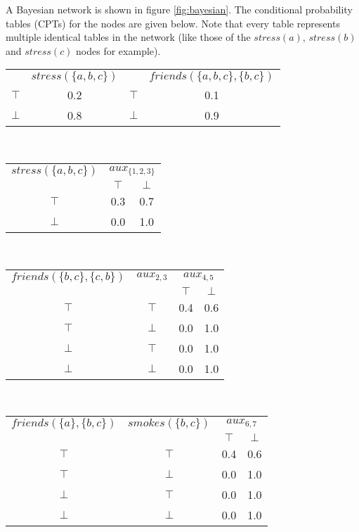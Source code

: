 A Bayesian network is shown in figure \ref{fig:bayesian}. The conditional probability tables (CPTs) for the nodes are given below. Note that every table represents multiple identical tables in the network (like those of the $stress(a)$, $stress(b)$ and $stress(c)$ nodes for example).

\begin{center}

	\begin{tabular}{c|cc|c}
		& \underline{$stress(\{a,b,c\})$} & & \underline{$friends(\{a,b,c\},\{b,c\})$}\\
		$\top$ & 0.2 & $\top$ & 0.1 \\
		$\bot$ & 0.8 & $\bot$ & 0.9
	\end{tabular}
	\vspace{0.5cm}\\
	
	\begin{tabular}{c|cc}
		\underline{$stress(\{a,b,c\})$} & \multicolumn{2}{c}{\underline{$aux_{\{1,2,3\}}$}} \\
		& $\top$ & $\bot$ \\
		$\top$ & 0.3 & 0.7 \\
		$\bot$ & 0.0 & 1.0
	\end{tabular}
	\vspace{0.5cm}\\
	
	\begin{tabular}{cc|cc}
		\underline{$friends(\{b,c\},\{c,b\})$} & \underline{$aux_{2,3}$} & \multicolumn{2}{c}{\underline{$aux_{4,5}$}} \\
		& & $\top$ & $\bot$ \\
		$\top$ & $\top$ & 0.4 & 0.6 \\
		$\top$ & $\bot$ & 0.0 & 1.0 \\
		$\bot$ & $\top$ & 0.0 & 1.0 \\
		$\bot$ & $\bot$ & 0.0 & 1.0 \\
	\end{tabular}
	\vspace{0.5cm}\\
	
	\begin{tabular}{cc|cc}
		\underline{$friends(\{a\},\{b,c\})$} & \underline{$smokes(\{b,c\})$} & \multicolumn{2}{c}{\underline{$aux_{6,7}$}} \\
		& & $\top$ & $\bot$ \\
		$\top$ & $\top$ & 0.4 & 0.6 \\
		$\top$ & $\bot$ & 0.0 & 1.0 \\
		$\bot$ & $\top$ & 0.0 & 1.0 \\
		$\bot$ & $\bot$ & 0.0 & 1.0 \\
	\end{tabular}
	\vspace{0.5cm}\\
	

\end{center}
